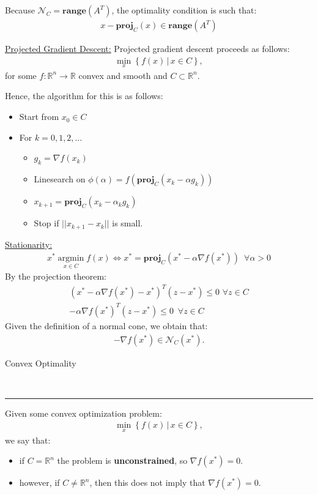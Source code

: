 \documentclass{article}
\newcommand{\header}[1]{\begin{large}\noindent #1\end{large}\\\rule{\textwidth}{0.5pt}}
\newcommand{\sheader}[1]{\underline{#1:}}
\newcommand{\curly}[1]{\left\{#1\right\}}
\newcommand{\oper}[2]{\underset{#2}{\operatorname{#1}}}
\begin{document}
Because $\mathcal{N}_C = \mathbf{range}(A^T)$, the optimality condition 
is such that:
\begin{align*}
    x - \mathbf{proj}_C(x) \in \mathbf{range}(A^T)
\end{align*}

\sheader{Projected Gradient Descent} Projected gradient 
descent proceeds as follows:
\begin{align*}
    \min_x \curly{f(x) \,|\, x \in C},
\end{align*}
for some $f : \mathbb{R}^n \to \mathbb{R}$ convex and smooth
and $C \subset \mathbb{R}^n$.

Hence, the algorithm for this is as follows:
\begin{itemize}
    \item Start from $x_0 \in C$
    \item For $k = 0, 1, 2, \ldots$
    \begin{itemize}
        \item $g_k = \nabla f(x_k)$
        \item Linesearch on $\phi(\alpha) = f(\mathbf{proj}_C(x_k - \alpha g_k))$
        \item $x_{k+1} = \mathbf{proj}_C(x_k - \alpha_k g_k)$
        \item Stop if $||x_{k+1} - x_k||$ is small.
    \end{itemize}
\end{itemize}

\sheader{Stationarity}
\begin{align*}
    x^* \oper{argmin}{x\in C} f(x) \iff x^* = \mathbf{proj}_C(x^* - \alpha \nabla f(x^*))\,\,\, \forall \alpha >0
\end{align*}
By the projection theorem:
\begin{align*}
    (x^* - \alpha \nabla f(x^*) - x^*)^T (z-x^*)\leq 0 \,\, \forall z \in C\\
    -\alpha \nabla f(x^*)^T(z-x^*) \leq 0\,\,\, \forall z \in C
\end{align*}
Given the definition of a normal cone, we obtain that:
\begin{align*}
    -\nabla f(x^*) \in \mathcal{N}_C(x^*).
\end{align*}

\pagebreak

\header{Convex Optimality}

Given some convex optimization problem:
\begin{align*}
    \min_x \curly{f(x) \,|\, x \in C},
\end{align*}
we say that:
\begin{itemize}
    \item if $C = \mathbb{R}^n$ the problem is \textbf{unconstrained}, so $\nabla f(x^*) = 0$.
    \item however, if $C \neq \mathbb{R}^n$, then this does not imply that $\nabla f(x^*) = 0$.
\end{itemize}
\end{document}
